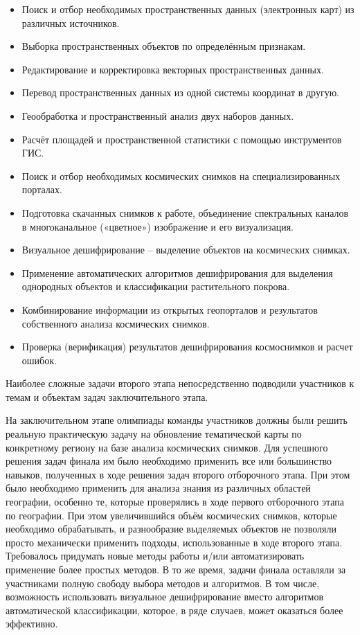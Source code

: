 \begin{itemize}
    \item Поиск и отбор необходимых пространственных данных (электронных карт) из различных источников.
    \item Выборка пространственных объектов по определённым признакам.
    \item Редактирование и корректировка векторных пространственных данных.
    \item Перевод пространственных данных из одной системы координат в другую.
    \item Геообработка и пространственный анализ двух наборов данных.
    \item Расчёт площадей и пространственной статистики с помощью инструментов ГИС.
    \item Поиск и отбор необходимых космических снимков на специализированных порталах.
    \item Подготовка скачанных снимков к работе, объединение спектральных каналов в многоканальное («цветное») изображение и его визуализация.
    \item Визуальное дешифрирование – выделение объектов на космических снимках.
    \item Применение автоматических алгоритмов дешифрирования для выделения однородных объектов и классификации растительного покрова.
    \item Комбинирование информации из открытых геопорталов и результатов собственного анализа космических снимков.
    \item Проверка (верификация) результатов дешифрирования космоснимков и расчет ошибок.
\end{itemize}

Наиболее сложные задачи второго этапа непосредственно подводили участников к темам и объектам задач заключительного этапа.

На заключительном этапе олимпиады команды участников должны были решить реальную практическую задачу на обновление тематической карты по конкретному региону на базе анализа космических снимков. Для успешного решения задач финала им было необходимо применить все или большинство навыков, полученных в ходе решения задач второго отборочного этапа. При этом было необходимо применить для анализа знания из различных областей географии, особенно те, которые проверялись в ходе первого отборочного этапа по географии. При этом увеличившийся объём космических снимков, которые необходимо обрабатывать, и разнообразие выделяемых объектов не позволяли просто механически применить подходы, использованные в ходе второго этапа. Требовалось придумать новые методы работы и/или автоматизировать применение более простых методов. В то же время, задачи финала оставляли за участниками полную свободу выбора методов и алгоритмов. В том числе, возможность использовать визуальное дешифрирование вместо алгоритмов автоматической классификации, которое, в ряде случаев, может оказаться более эффективно.

\clearpage
\endgroup

